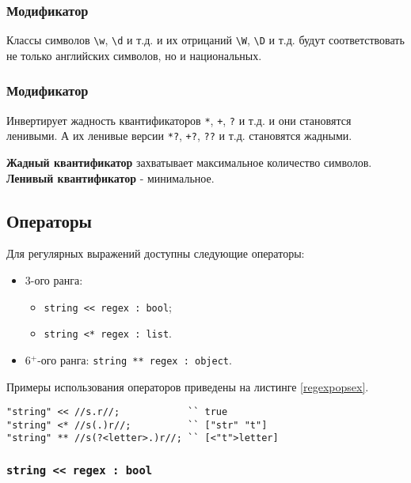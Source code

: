 \documentclass[a4paper, 14pt]{extarticle}
\newenvironment{icItems}
	{ \begin{itemize} [noitemsep,nolistsep] }
	{ \end{itemize} }
\begin{document}
\subsubsection{Модификатор }

Классы символов \lstinline|\w|, \lstinline|\d| и т.д. и их отрицаний \lstinline|\W|, \lstinline|\D| и т.д. будут соответствовать не только английских символов, но и национальных.

\subsubsection{Модификатор }

Инвертирует жадность квантификаторов \lstinline|*|, \lstinline|+|, \lstinline|?| и т.д. и они становятся ленивыми. А их ленивые версии \lstinline|*?|, \lstinline|+?|, \lstinline|??| и т.д. становятся жадными.

{\bf Жадный квантификатор} захватывает максимальное количество символов. {\bf Ленивый квантификатор} - минимальное.

\subsection{Операторы}

Для регулярных выражений доступны следующие операторы:
\begin{icItems}
\item
	3-ого ранга:
	\begin{icItems}
	\item
		\lstinline|string << regex : bool|;
	\item
		\lstinline|string <* regex : list|.
	\end{icItems}

\item 
	6$^+$-ого ранга: \lstinline|string ** regex : object|.
\end{icItems}

Примеры использования операторов приведены на листинге \ref{regexpopsex}.

\begin{lstlisting}[caption=Операторы регулярных выражений, label=regexpopsex]
"string" << //s.r//;            `` true
"string" <* //s(.)r//;          `` ["str" "t"]
"string" ** //s(?<letter>.)r//; `` [<"t">letter]
\end{lstlisting}

\subsubsection{\lstinline|string << regex : bool|}
\end{document}
